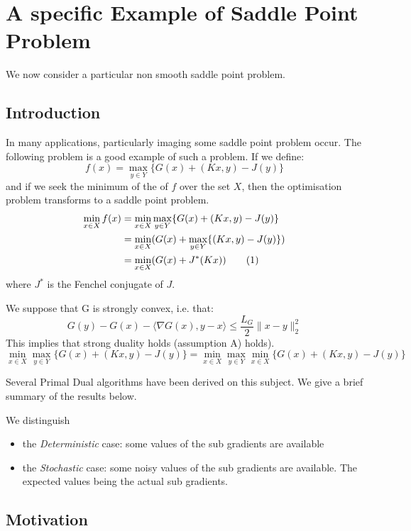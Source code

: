\documentclass[12pt,reqno]{amsart}
\numberwithin{equation}{section}
\newcommand\numberthis{\addtocounter{equation}{1}\tag{\theequation}}
\begin{document}
\section{ A specific Example of Saddle Point Problem}

We now consider a particular  non smooth saddle point problem.

\subsection{Introduction}

In many applications, particularly imaging some saddle point problem occur. The following problem is a good example of such a problem.
If we define:
$$
f(x) = \max_{y \in Y} \{ G(x) + (Kx,y) - J(y) \} 
$$
and if we seek the minimum of the of $f$ over the set $X$, then the optimisation problem transforms to a saddle point problem.
\begin{align*}
\min_{x \in X} f(x) &= \min_{x \in X}\max_{y \in Y} \{ G(x) + (Kx,y) - J(y)\} \\
&= \min_{x \in X} (G(x) + \max_{y \in Y} \{  (Kx,y) - J(y)\})\\
&= \min_{x \in X} (G(x) + J^{*}(Kx)) \numberthis \label{SPPpart}
\end{align*}
where $J^{*}$ is the Fenchel conjugate of $J$.

We suppose that G is strongly convex, i.e. that:
$$
G(y) - G(x) - \langle \nabla G(x),y - x\rangle \leq \dfrac{L_{G}}{2} \lVert x - y \rVert_{2}^{2}
$$
This implies that strong duality holds (assumption A) holds).
$$
\min_{x \in X}\max_{y \in Y} \{ G(x) + (Kx,y) - J(y)\} = \min_{x \in X}\max_{y \in Y}\min_{x \in X} \{ G(x) + (Kx,y) - J(y)\}
$$

Several Primal Dual algorithms have been derived on this subject.
We give a brief summary of the results below.

We distinguish 

\begin{itemize}
\item the \emph{Deterministic} case: some values of the sub gradients are available
\item the \emph{Stochastic} case:  some noisy values of the sub gradients are available. 
The expected values being the actual sub gradients.
\end{itemize}

\subsection{Motivation}
\end{document}

